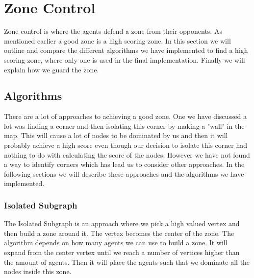 \documentclass[11pt]{article}
\begin{document}
\section{Zone Control}
Zone control is where the agents defend a zone from their opponents. As mentioned earlier a good zone is a high scoring zone. In this section we will outline and compare the different algorithms we have implemented to find a high scoring zone, where only one is used in the final implementation. Finally we will explain how we guard the zone.

\subsection{Algorithms}
There are a lot of approaches to achieving a good zone. One we have discussed a lot was finding a corner and then isolating this corner by making a "wall" in the map. This will cause a lot of nodes to be dominated by us and then it will probably achieve a high score even though our decision to isolate this corner had nothing to do with calculating the score of the nodes. However we have not found a way to identify corners which has lead us to consider other approaches. In the following sections we will describe these approaches and the algorithms we have implemented.

\subsubsection{Isolated Subgraph}
The Isolated Subgraph is an approach where we pick a high valued vertex and then build a zone around it. The vertex becomes the center of the zone. The algorithm depends on how many agents we can use to build a zone. It will expand from the center vertex until we reach a number of vertices higher than the amount of agents. Then it will place the agents such that we dominate all the nodes inside this zone.
\end{document}

